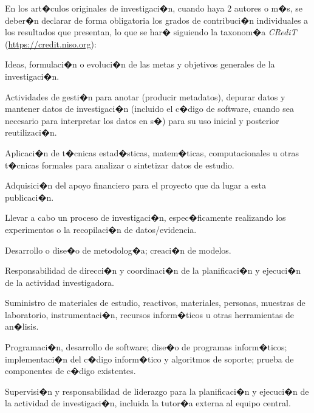 \documentclass[10pt,twoside]{rcmart} %
\begin{document}
	En los art�culos originales de investigaci�n, cuando haya 2 autores o m�s, se deber�n declarar de forma obligatoria los grados de contribuci�n individuales a los resultados que presentan, lo que se har� siguiendo la taxonom�a \textit{CRediT} (\url{https://credit.niso.org}):
	\begin{description}\setlength{\parskip}{0pt}
		\item[Conceptualizaci�n] Ideas, formulaci�n o evoluci�n de las metas y objetivos generales de la investigaci�n.
		
		\item[Curaci�n de datos] Actividades de gesti�n para anotar (producir metadatos), depurar datos y mantener datos de investigaci�n (incluido el c�digo de software, cuando sea necesario para interpretar los datos en s�) para su uso inicial y posterior reutilizaci�n.
		
		\item[An�lisis formal] Aplicaci�n de t�cnicas estad�sticas, matem�ticas, computacionales u otras t�cnicas formales para analizar o sintetizar datos de estudio.
		
		\item[Adquisici�n de Financiamiento] Adquisici�n del apoyo financiero para el proyecto que da lugar a esta publicaci�n.
		
		\item[Investigaci�n] Llevar a cabo un proceso de investigaci�n, espec�ficamente realizando los experimentos o la recopilaci�n de datos/evidencia.
		
		\item[Metodolog�a] Desarrollo o dise�o de metodolog�a; creaci�n de modelos.
		
		\item[Administraci�n de proyecto] Responsabilidad de direcci�n y coordinaci�n de la planificaci�n y ejecuci�n de la actividad investigadora.
		
		\item[Recursos] Suministro de materiales de estudio, reactivos, materiales, personas, muestras de laboratorio, instrumentaci�n, recursos inform�ticos u otras herramientas de an�lisis.
		
		\item[Software] Programaci�n, desarrollo de software; dise�o de programas inform�ticos; implementaci�n del c�digo inform�tico y algoritmos de soporte; prueba de componentes de c�digo existentes.
		
		\item[Supervisi�n] Supervisi�n y responsabilidad de liderazgo para la planificaci�n y ejecuci�n de la actividad de investigaci�n, incluida la tutor�a externa al equipo central.
		

\end{description}
\end{document}
